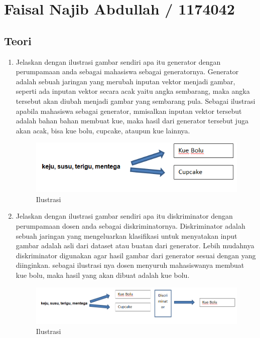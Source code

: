\section{Faisal Najib Abdullah / 1174042}
\subsection{Teori}

\begin{enumerate}

\item Jelaskan dengan ilustrasi gambar sendiri apa itu generator dengan perumpamaan anda sebagai mahasiswa sebagai generatornya.
Generator adalah sebuah jaringan yang merubah inputan vektor menjadi gambar, seperti ada inputan vektor secara acak yaitu angka sembarang, maka angka tersebut akan diubah menjadi gambar yang sembarang pula. Sebagai ilustrasi apabila mahasiswa sebagai generator, mmisalkan inputan vektor tersebut adalah bahan bahan membuat kue, maka hasil dari generator tersebut juga akan acak, bisa kue bolu, cupcake, ataupun kue lainnya.
\begin{figure}[ht]
\centering
\includegraphics[scale=0.4]{figures/1174042/chapter8/1.PNG}
\caption{Ilustrasi}
\label{Contoh}
\end{figure}


\item Jelaskan dengan ilustrasi gambar sendiri apa itu diskriminator dengan perumpamaan dosen anda sebagai diskriminatornya.
Diskriminator adalah sebuah jaringan yang mengeluarkan klasifikasi untuk menyatakan input gambar adalah asli dari dataset atau buatan dari generator. Lebih mudahnya diskriminator digunakan agar hasil gambar dari generator sesuai dengan yang diinginkan. sebagai ilustrasi nya dosen menyuruh mahasiswanya membuat kue bolu, maka hasil yang akan dibuat adalah kue bolu.
\begin{figure}[ht]
\centering
\includegraphics[scale=0.4]{figures/1174042/chapter8/2.PNG}
\caption{Ilustrasi}
\label{Contoh}
\end{figure}



\end{enumerate}
